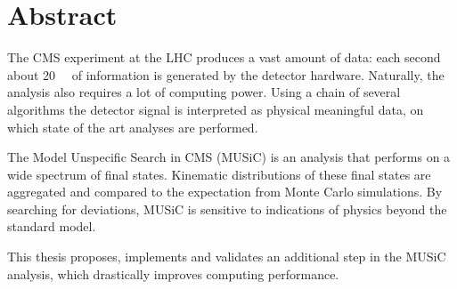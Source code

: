 
\chapter*{Abstract}
The CMS experiment at the LHC produces a vast amount of data: each second about \SI{20}{\tera\byte} of information is generated by the detector hardware. Naturally, the analysis also requires a lot of computing power. Using a chain of several algorithms the detector signal is interpreted as physical meaningful data, on which state of the art analyses are performed. 

The Model Unspecific Search in CMS (MUSiC) is an analysis that performs on a wide spectrum of final states. Kinematic distributions of these final states are aggregated and compared to the expectation from Monte Carlo simulations. By searching for deviations, MUSiC is sensitive to indications of physics beyond the standard model.

This thesis proposes, implements and validates an additional step in the MUSiC analysis, which drastically improves computing performance.
